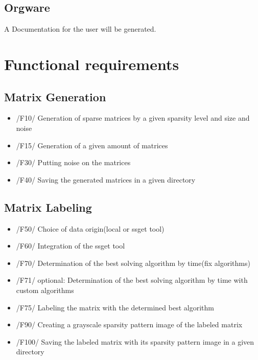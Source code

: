 \documentclass[parskip=full]{scrartcl}
\begin{document}
\subsection{Orgware}
A Documentation for the user will be generated.


\section{Functional requirements}
\subsection{Matrix Generation}
	\begin{itemize}
	\item /F10/ Generation of sparse matrices by a given sparsity level and size and noise
	\item /F15/ Generation of a given amount of matrices
	\item /F30/ Putting noise on the matrices
 	\item /F40/ Saving the generated matrices in a given directory
          \end{itemize}
\subsection{Matrix Labeling}
	\begin{itemize}
	\item /F50/ Choice of data origin(local or ssget tool) 
	\item /F60/ Integration of the ssget tool
	\item /F70/ Determination of the best solving algorithm by time(fix algorithms)
	\item /F71/ optional: Determination of the best solving algorithm by time with custom algorithms
	\item /F75/ Labeling the matrix with the determined best algorithm
	\item /F90/ Creating a grayscale sparsity pattern image of the labeled matrix
	\item /F100/ Saving the labeled matrix with its sparsity pattern image in a given directory 
	\end{itemize}
	
	
\end{document}
